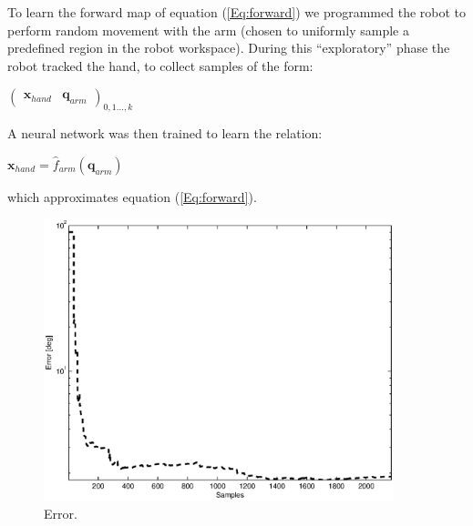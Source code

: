 To learn the forward map of equation (\ref{Eq:forward}) we programmed the robot 
to perform random movement with the arm (chosen to uniformly sample 
a predefined region in the robot workspace). During this ``exploratory'' phase the robot
tracked the hand, to collect samples of the form:
%
\begin{center}
\begin{math}
  \left(\begin{array}{cc}
    \mathbf x_{hand} & \mathbf q_{arm} \end{array}\right)_{0,1\dots,k}
\end{math}
\end{center}
%
A neural network was then trained to learn the relation:
%
\begin{center} 
\begin{math}
  \mathbf x_{hand}=\hat{f}_{arm}\left(\mathbf q_{arm}\right)
\end{math}
\end{center}
%
which approximates equation (\ref{Eq:forward}).

\begin{figure}[tbp]
\centerline{
\includegraphics[width=4.0in, angle=0 ]{./Figure/reachingError1.eps}
} \caption{Error.} 
\label{fig:Reaching error}
\end{figure}



























